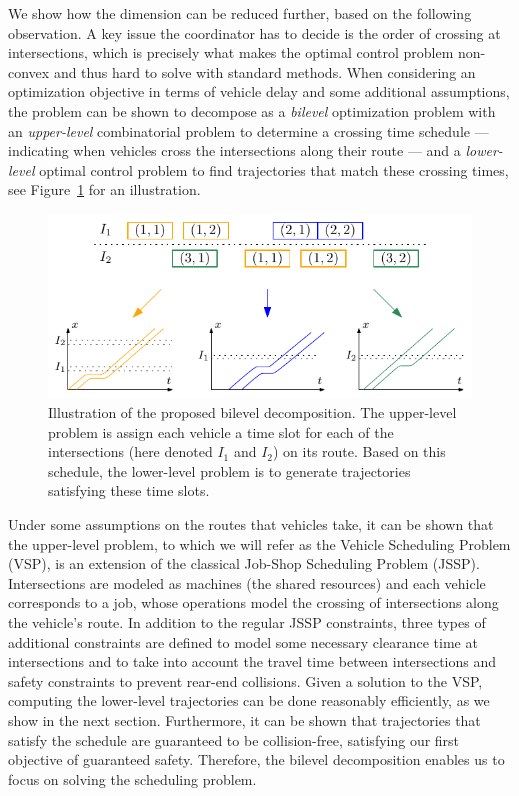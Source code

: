\documentclass[notitlepage]{report}
\begin{document}
We show how the dimension can be reduced further, based on the following
observation. A key issue the coordinator has to decide is the order of crossing
at intersections, which is precisely what makes the optimal control problem
non-convex and thus hard to solve with standard methods. When considering an
optimization objective in terms of vehicle delay and some additional
assumptions, the problem can be shown to decompose as a \textit{bilevel} optimization
problem with an \textit{upper-level} combinatorial problem to determine a crossing time
schedule --- indicating when vehicles cross the intersections along their route
--- and a \textit{lower-level} optimal control problem to find trajectories that match
these crossing times, see Figure~\ref{fig:network_bilevel} for an illustration.

\begin{figure}[h]
  \centering
  \includegraphics[width=1.0\textwidth]{figures/network_bilevel.pdf}
  \caption{Illustration of the proposed bilevel decomposition. The upper-level
    problem is assign each vehicle a time slot for each of the intersections
    (here denoted $I_{1}$ and $I_{2}$) on its route. Based on this schedule, the
    lower-level problem is to generate trajectories satisfying these time
    slots.}
  \label{fig:network_bilevel}
\end{figure}

Under some assumptions on the routes that vehicles take, it can be shown that
the upper-level problem, to which we will refer as the Vehicle Scheduling
Problem (VSP), is an extension of the classical Job-Shop Scheduling Problem
(JSSP). Intersections are modeled as machines (the shared resources) and each
vehicle corresponds to a job, whose operations model the crossing of
intersections along the vehicle's route.
%
In addition to the regular JSSP constraints, three types of additional
constraints are defined to model some necessary clearance time at intersections
and to take into account the travel time between intersections and safety
constraints to prevent rear-end collisions.
Given a solution to the VSP, computing the lower-level trajectories can be done
reasonably efficiently, as we show in the next section. Furthermore, it can be
shown that trajectories that satisfy the schedule are guaranteed to
be collision-free, satisfying our first objective of guaranteed safety.
Therefore, the bilevel decomposition enables us to focus on solving the
scheduling problem.
\end{document}

